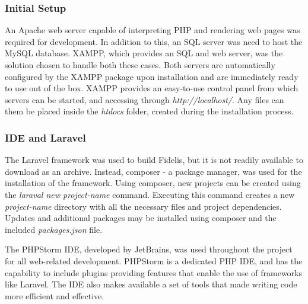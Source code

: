 \subsubsection{Initial Setup}
An Apache web server capable of interpreting PHP and rendering web pages was required for development. In addition to this, an SQL server was need to host the MySQL database. XAMPP, which provides an SQL and web server, was the solution chosen to handle both these cases. Both servers are automatically configured by the XAMPP package upon installation and are immediately ready to use out of the box. XAMPP provides an easy-to-use control panel from which servers can be started, and accessing through \textit{http://localhost/}. Any files can them be placed inside the \textit{htdocs} folder, created during the installation process.

\subsubsection{IDE and Laravel}
The Laravel framework was used to build Fidelis, but it is not readily available to download as an archive. Instead, composer - a package manager, was used for the installation of the framework. Using composer, new projects can be created using the \textit{laraval new project-name} command. Executing this command creates a new \textit{project-name} directory with all the necessary files and project dependencies. Updates and additional packages may be installed using composer and the included \textit{packages.json} file.

The PHPStorm IDE, developed by JetBrains, was used throughout the project for all web-related development. PHPStorm is a dedicated PHP IDE, and has the capability to include plugins providing features that enable the use of frameworks like Laravel. The IDE also makes available a set of tools that made writing code more efficient and effective.